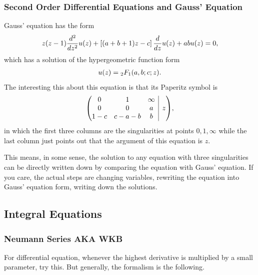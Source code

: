 \documentclass[letterpaper,10pt,english]{sphinxmanual}
\makeatletter
\newenvironment{amatrix}[1]{\left(\begin{array}{@{}*{#1}{c}|c@{}}}{\end{array}\right)}
\makeatother
\begin{document}
\subsubsection{Second Order Differential Equations and Gauss' Equation}
\label{equation-solving:second-order-differential-equations-and-gauss-equation}
Gauss' equation has the form
\begin{gather}
\begin{split}z(z-1)\frac{d^2}{dz^2} u(z) + \left[(a+b+1)z -c \right] \frac{d}{dz} u(z) + a b u(z) =0,\end{split}\notag
\end{gather}
which has a solution of the hypergeometric function form
\begin{gather}
\begin{split}u(z) = {}_2 F_{1}(a,b;c;z).\end{split}\notag
\end{gather}
The interesting this about this equation is that its Paperitz symbol is
\begin{gather}
\begin{split}\begin{amatrix}{3}
0 & 1 & \infty &  \\  0 & 0 & a & z \\ 1-c & c-a-b & b &
 \end{amatrix} ,\end{split}\notag
\end{gather}
in which the first three columns are the singularities at points \(0,1,\infty\) while the last column just points out that the argument of this equation is \(z\).

This means, in some sense, the solution to any equation with three singularities can be directly written down by comparing the equation with Gauss' equation. If you care, the actual steps are changing variables, rewriting the equation into Gauss' equation form, writing down the solutions.


\subsection{Integral Equations}
\label{equation-solving:integral-equations}

\subsubsection{Neumann Series AKA WKB}
\label{equation-solving:neumann-series-aka-wkb}
For differential equation, whenever the highest derivative is multiplied by a small parameter, try this. But generally, the formalism is the following.
\end{document}
